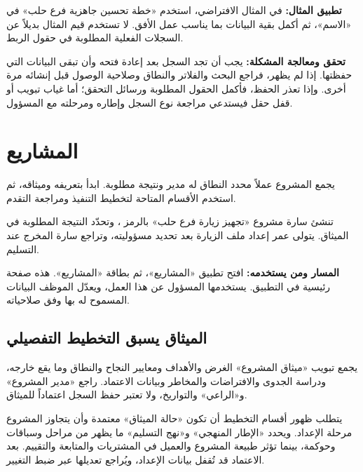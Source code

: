 \textbf{تطبيق المثال:} في المثال الافتراضي، استخدم «خطة تحسين جاهزية فرع حلب» في «الاسم»، ثم أكمل بقية البيانات بما يناسب عمل الأفق. لا تستخدم قيم المثال بديلاً عن السجلات الفعلية المطلوبة في حقول الربط.

\textbf{تحقق ومعالجة المشكلة:} يجب أن تجد السجل بعد إعادة فتحه وأن تبقى البيانات التي حفظتها. إذا لم يظهر، فراجع البحث والفلاتر والنطاق وصلاحية الوصول قبل إنشائه مرة أخرى. وإذا تعذر الحفظ، فأكمل الحقول المطلوبة ورسائل التحقق؛ أما غياب تبويب أو قفل حقل فيستدعي مراجعة نوع السجل وإطاره ومرحلته مع المسؤول.

\clearpage
\section{المشاريع}
\label{sec:projects-feature-projects}

يجمع المشروع عملاً محدد النطاق له مدير ونتيجة مطلوبة. ابدأ بتعريفه وميثاقه، ثم استخدم الأقسام المتاحة لتخطيط التنفيذ ومراجعة التقدم.

\begin{rcnote}
تنشئ سارة مشروع «تجهيز زيارة فرع حلب» بالرمز ، وتحدّد النتيجة المطلوبة في الميثاق. يتولى عمر إعداد ملف الزيارة بعد تحديد مسؤوليته، وتراجع سارة المخرج عند التسليم.
\end{rcnote}

\textbf{المسار ومن يستخدمه:} افتح تطبيق «المشاريع»، ثم بطاقة «المشاريع». هذه صفحة رئيسية في التطبيق. يستخدمها المسؤول عن هذا العمل، ويعدّل الموظف البيانات المسموح له بها وفق صلاحياته.

\subsection{الميثاق يسبق التخطيط التفصيلي}
يجمع تبويب «ميثاق المشروع» الغرض والأهداف ومعايير النجاح والنطاق وما يقع خارجه، ودراسة الجدوى والافتراضات والمخاطر وبيانات الاعتماد. راجع «مدير المشروع» و«الراعي» والتواريخ، ولا تعتبر حفظ السجل اعتماداً للميثاق.

يتطلب ظهور أقسام التخطيط أن تكون «حالة الميثاق» معتمدة وأن يتجاوز المشروع مرحلة الإعداد. ويحدد «الإطار المنهجي» و«نهج التسليم» ما يظهر من مراحل وسباقات وحوكمة، بينما تؤثر طبيعة المشروع والعميل في المشتريات والمتابعة والتقييم. بعد الاعتماد قد تُقفل بيانات الإعداد، ويُراجع تعديلها عبر ضبط التغيير.

